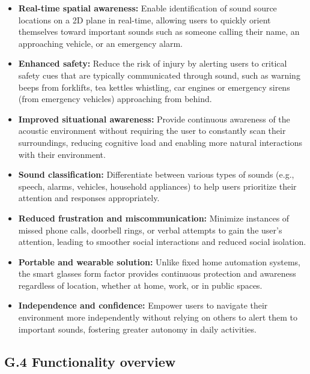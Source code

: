 \documentclass[12pt]{article}
\theoremstyle{definition}
\begin{document}
\begin{itemize}
\item \textbf{Real-time spatial awareness:} Enable identification of sound
source locations on a 2D plane in real-time, allowing users to quickly orient
themselves toward important sounds such as someone calling their name, an
approaching vehicle, or an emergency alarm.

\item \textbf{Enhanced safety:} Reduce the risk of injury by alerting users to
critical safety cues that are typically communicated through sound, such as
warning beeps from forklifts, tea kettles whistling, car engines or emergency
sirens (from emergency vehicles) approaching from behind.

\item \textbf{Improved situational awareness:} Provide continuous awareness of
the acoustic environment without requiring the user to constantly scan their
surroundings, reducing cognitive load and enabling more natural interactions
with their environment.

\item \textbf{Sound classification:} Differentiate between various types of
sounds (e.g., speech, alarms, vehicles, household appliances) to help users
prioritize their attention and responses appropriately.

\item \textbf{Reduced frustration and miscommunication:} Minimize instances of
missed phone calls, doorbell rings, or verbal attempts to gain the user's
attention, leading to smoother social interactions and reduced social isolation.

\item \textbf{Portable and wearable solution:} Unlike fixed home automation
systems, the smart glasses form factor provides continuous protection and
awareness regardless of location, whether at home, work, or in public spaces.

\item \textbf{Independence and confidence:} Empower users to navigate their
environment more independently without relying on others to alert them to
important sounds, fostering greater autonomy in daily activities.
\end{itemize}



\subsection{G.4 Functionality overview}
\end{document}

